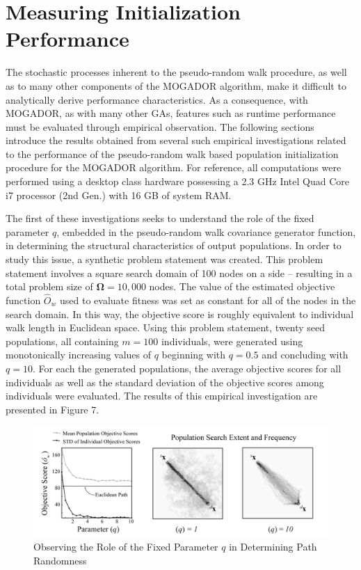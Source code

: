 \section{Measuring Initialization Performance}
    
The stochastic processes inherent to the pseudo-random walk procedure, as well as to many other components of the MOGADOR algorithm, make it difficult to analytically derive performance characteristics. As a consequence, with MOGADOR, as with many other GAs, features such as runtime performance must be evaluated through empirical observation. The following sections introduce the results obtained from several such empirical investigations related to the performance of the pseudo-random walk based population initialization procedure for the MOGADOR algorithm. For reference, all computations were performed using a desktop class hardware possessing a 2.3 GHz Intel Quad Core i7 processor (2nd Gen.) with 16 GB of system RAM.
            
The first of these investigations seeks to understand the role of the fixed parameter $q$, embedded in the pseudo-random walk covariance generator function, in determining the structural characteristics of output populations. In order to study this issue, a synthetic problem statement was created. This problem statement involves a square search domain of 100 nodes on a side – resulting in a total problem size of $\boldsymbol\Omega = 10,000$ nodes. The value of the estimated objective function $\hat{O}_w$ used to evaluate fitness was set as constant for all of the nodes in the search domain. In this way, the objective score is roughly equivalent to individual walk length in Euclidean space. Using this problem statement, twenty seed populations, all containing $m = 100$ individuals, were generated  using monotonically increasing values of $q$ beginning with $q = 0.5$ and concluding with $q = 10$. For each the generated populations, the average objective scores for all individuals as well as the standard deviation of the objective scores among individuals were evaluated. The results of this empirical investigation are presented in Figure 7.
            
            \begin{figure}[Observing the Role of the Fixed Parameter $q$ in Determining Individual Path Randomness]
            \centering
            \includegraphics[width=5.5in]{figures/path-randomness-study.png}
            \caption[Observing the Role of the Fixed Parameter $q$ in Determining Individual Path Randomness]{Observing the Role of the Fixed Parameter $q$ in Determining Path Randomness}
            \label{fig:path-randomness}
            \end{figure}
            

